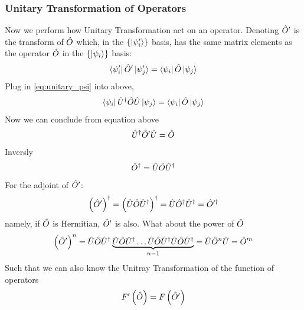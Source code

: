 \subsubsection{Unitary Transformation of Operators} \label{sec:unitary_transform_operator}
Now we perform how Unitary Transformation act on an operator. Denoting $\hat{O}'$ is the transform of $\hat{O}$ which, in the $\{\ket{\psi'_i}\}$ basis, has the same matrix elements as the operator $\hat{O}$ in the $\{\ket{\psi_i}\}$ basis: 
\begin{align}
    \bra{\psi'_i} \hat{O}' \ket{\psi'_j} = \bra{\psi_i} \hat{O} \ket{\psi_j}
\end{align}
Plug in \cref{eq:unitary_psi} into above,
\begin{eqnarray}
    \bra{\psi_i} \hat{U}^ \dag \hat{O} \hat{U} \ket{\psi_j} = \bra{\psi_i} \hat{O} \ket{\psi_j}
\end{eqnarray}
Now we can conclude from equation above
\begin{eqnarray}
    \hat{U}^ \dag \hat{O}' \hat{U} = \hat{O}
\end{eqnarray}
Inversly
\begin{eqnarray}
    \hat{O}^ \dag = \hat{U} \hat{O} \hat{U}^ \dag
\end{eqnarray}
For the adjoint of $\hat{O}'$:
\begin{align}
    \left(\hat{O}'\right)^ \dag = \left(\hat{U} \hat{O} \hat{U}^ \dag\right)^ \dag = \hat{U} \hat{O}^ \dag \hat{U}^ \dag = \hat{O}'^ \dag
\end{align}
namely, if $\hat{O}$ is Hermitian, $\hat{O}'$ is also. What about the power of $\hat{O}$
\begin{eqnarray}
    \left(\hat{O}'\right)^n = \hat{U} \hat{O} \hat{U}^ \dag \underbrace{\hat{U} \hat{O} \hat{U}^ \dag \dots \hat{U} \hat{O} \hat{U}^ \dag \hat{U} \hat{O} \hat{U}^ \dag}_{n-1} = \hat{U} \hat{O}^n \hat{U} = \hat{O}'^n
\end{eqnarray}
Such that we can also know the Unitray Transformation of the function of operators 
\begin{eqnarray}
    F' \left(\hat{O}\right) = F \left(\hat{O}'\right)
\end{eqnarray}

